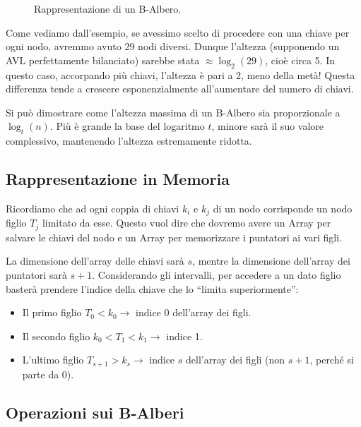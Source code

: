 \documentclass[12pt]{report}
\begin{document}
	\begin{figure}[H]
		\centering
		\caption{Rappresentazione di un B-Albero.}
		\label{fig:balbero}
	\end{figure}
	
	Come vediamo dall'esempio, se avessimo scelto di procedere con una chiave per ogni nodo, avremmo avuto 29 nodi diversi. Dunque l'altezza (supponendo un AVL perfettamente bilanciato) sarebbe stata $\approx \log_2(29)$, cioè circa 5. In questo caso, accorpando più chiavi, l'altezza è pari a 2, meno della metà! Questa differenza tende a crescere esponenzialmente all'aumentare del numero di chiavi.
	
	Si può dimostrare come l'altezza massima di un B-Albero sia proporzionale a $\log_t(n)$. Più è grande la base del logaritmo $t$, minore sarà il suo valore complessivo, mantenendo l'altezza estremamente ridotta.
	
	\subsection{Rappresentazione in Memoria}
	Ricordiamo che ad ogni coppia di chiavi $k_i$ e $k_j$ di un nodo corrisponde un nodo figlio $T_j$ limitato da esse. Questo vuol dire che dovremo avere un Array per salvare le chiavi del nodo e un Array per memorizzare i puntatori ai vari figli. 
	
	La dimensione dell'array delle chiavi sarà $s$, mentre la dimensione dell'array dei puntatori sarà $s+1$. Considerando gli intervalli, per accedere a un dato figlio basterà prendere l'indice della chiave che lo ``limita superiormente'':
	\begin{itemize}
		\item Il primo figlio $T_0 < k_0 \rightarrow$ indice 0 dell'array dei figli.
		\item Il secondo figlio $k_0 < T_1 < k_1 \rightarrow$ indice 1.
		\item L'ultimo figlio $T_{s+1} > k_s \rightarrow$ indice $s$ dell'array dei figli (non $s+1$, perché si parte da 0).
	\end{itemize}
	
	\subsection{Operazioni sui B-Alberi}
	
\end{document}
